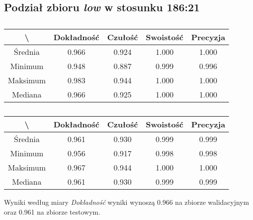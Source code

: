 \subsection{Podział zbioru \textit{low} w stosunku 186:21}


\begin{table}[H]
	\centering
	\caption{}
	\vspace{6pt}
	{\footnotesize
		\begin{tabular}{|c|c|c|c|c|}
      \hline \textbackslash & Dokładność & Czułość & Swoistość & Precyzja \\
      \hline Średnia & 0.966 & 0.924 & 1.000 & 1.000 \\
      \hline Minimum & 0.948 & 0.887 & 0.999 & 0.996 \\
      \hline Maksimum & 0.983 & 0.944 & 1.000 & 1.000 \\
      \hline Mediana & 0.966 & 0.925 & 1.000 & 1.000 \\
      \hline
    \end{tabular}
    \label{Tab:lowsplitb_val}
	}
	\vspace{0pt}
\end{table}

\begin{table}[H]
	\centering
	\caption{}
	\vspace{6pt}
	{\footnotesize
		\begin{tabular}{|c|c|c|c|c|}
      \hline \textbackslash & Dokładność & Czułość & Swoistość & Precyzja \\
      \hline Średnia & 0.961 & 0.930 & 0.999 & 0.999 \\
      \hline Minimum & 0.956 & 0.917 & 0.998 & 0.998 \\
      \hline Maksimum & 0.967 & 0.944 & 1.000 & 1.000 \\
      \hline Mediana & 0.961 & 0.930 & 0.999 & 0.999 \\
      \hline
    \end{tabular}
    \label{Tab:lowsplitb_test}
	}
	\vspace{0pt}
\end{table}

Wyniki według miary \textit{Dokładność} wyniki wynoszą 0.966 na zbiorze walidacyjnym oraz 0.961 na zbiorze testowym.
